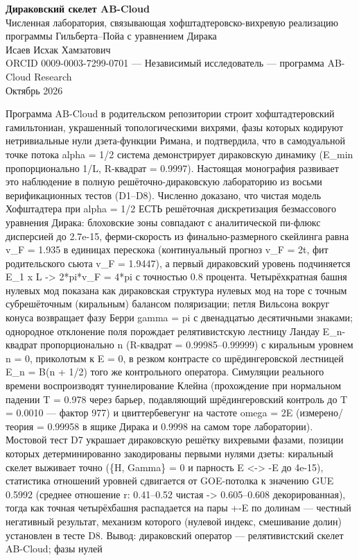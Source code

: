 \documentclass[11pt,a4paper]{article}
\begin{document}
\begin{center}
{\huge\bfseries\color{labblue} Дираковский скелет AB-Cloud}\\[0.8em]
{\large Численная лаборатория, связывающая хофштадтеровско-вихревую реализацию программы Гильберта--Пойа с уравнением Дирака}\\[1.2em]
{\normalsize Исаев Исхак Хамзатович}\\[0.3em]
{\small ORCID 0009-0003-7299-0701 --- Независимый исследователь --- программа AB-Cloud Research}\\[0.3em]
{\small Октябрь 2026}
\end{center}
\begin{tcolorbox}[breakable, colback=labblue!6, colframe=labblue!70!black, boxrule=0.6pt, title={Abstract / Аннотация}]
Программа AB-Cloud в родительском репозитории строит хофштадтеровский гамильтониан, украшенный топологическими вихрями, фазы которых кодируют нетривиальные нули дзета-функции Римана, и подтвердила, что в самодуальной точке потока alpha = 1/2 система демонстрирует дираковскую динамику (E\_\allowbreak{}min пропорционально 1/L, R-квадрат = 0.9997). Настоящая монография развивает это наблюдение в полную решёточно-дираковскую лабораторию из восьми верификационных тестов (D1--D8). Численно доказано, что чистая модель Хофштадтера при alpha = 1/2 ЕСТЬ решёточная дискретизация безмассового уравнения Дирака: блоховские зоны совпадают с аналитической пи-флюкс дисперсией до 2.7e-15, ферми-скорость из финально-размерного скейлинга равна v\_\allowbreak{}F = 1.935 в единицах перескока (континуальный прогноз v\_\allowbreak{}F = 2t, фит родительского сьюта v\_\allowbreak{}F = 1.9447), а первый дираковский уровень подчиняется E\_\allowbreak{}1 x L -> 2*pi*v\_\allowbreak{}F = 4*pi с точностью 0.8 процента. Четырёхкратная башня нулевых мод показана как дираковская структура нулевых мод на торе с точным субрешёточным (киральным) балансом поляризации; петля Вильсона вокруг конуса возвращает фазу Берри gamma = pi с двенадцатью десятичными знаками; однородное отклонение поля порождает релятивистскую лестницу Ландау E\_\allowbreak{}n-квадрат пропорционально n (R-квадрат = 0.99985--0.99999) с киральным уровнем n = 0, приколотым к E = 0, в резком контрасте со шрёдингеровской лестницей E\_\allowbreak{}n = B(n + 1/2) того же контрольного оператора. Симуляции реального времени воспроизводят туннелирование Клейна (прохождение при нормальном падении T = 0.978 через барьер, подавляющий шрёдингеровский контроль до T = 0.0010 --- фактор 977) и цвиттербевегунг на частоте omega = 2E (измерено/теория = 0.99958 в ящике Дирака и 0.9998 на самом торе лаборатории). Мостовой тест D7 украшает дираковскую решётку вихревыми фазами, позиции которых детерминированно закодированы первыми нулями дзеты: киральный скелет выживает точно (\{H, Gamma\} = 0 и парность E <-> -E до 4e-15), статистика отношений уровней сдвигается от GOE-потолка к значению GUE 0.5992 (среднее отношение r: 0.41--0.52 чистая -> 0.605--0.608 декорированная), тогда как точная четырёхбашня распадается на пары +-E по долинам --- честный негативный результат, механизм которого (нулевой индекс, смешивание долин) установлен в тесте D8. Вывод: дираковский оператор --- релятивистский скелет AB-Cloud; фазы нулей 
\end{tcolorbox}
\end{document}
